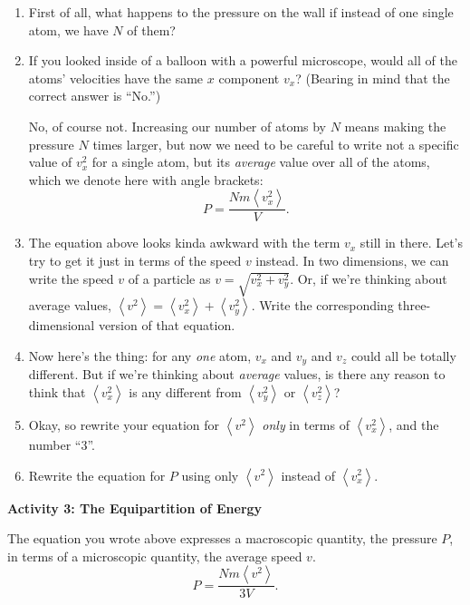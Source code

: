\begin{enumerate}[labparts]

\item First of all, what happens to the pressure on the wall if instead of one single atom, we have $N$ of them?
\answerspace{0.4in}


\item If you looked inside of a balloon with a powerful microscope, would all of the atoms' velocities have the same $x$ component $v_x$?  (Bearing in mind that the correct answer is ``No.'')
\answerspace{0.4in}


No, of course not.  Increasing our number of atoms by $N$ means making the pressure $N$ times larger, but now we need to be careful to write not a specific value of $v_x^2$ for a single atom, but its \textit{average} value over all of the atoms, which we denote here with angle brackets:
$$P=\frac{Nm \left< v_x^2 \right>}{V}.$$

\item The equation above looks kinda awkward with the term $v_x$ still in there.  Let's try to get it just in terms of the speed $v$ instead.  In two dimensions, we can write the speed $v$ of a particle as $v = \sqrt{v_x^2 + v_y^2}$.  Or, if we're thinking about average values, 
$\left< v^2 \right> = \left< v_x^2 \right> + \left< v_y^2 \right> $.
Write the corresponding three-dimensional version of that equation.
\answerspace{0.4in}

\item Now here's the thing: for any \textit{one} atom, $v_x$ and $v_y$ and $v_z$ could all be totally different.  But if we're thinking about \textit{average} values, is there any reason to think that $\left< v_x^2 \right >$ is any different from 
 $\left< v_y^2 \right >$ or $\left< v_z^2 \right >$?
\answerspace{0.4in}

\item Okay, so rewrite your equation for $\left< v^2 \right>$ \textit{only} in terms of $\left< v_x^2 \right>$, and the number ``3''. 
\answerspace{0.4in}

\item Rewrite the equation for $P$ using only $\left< v^2 \right>$ instead of $\left< v_x^2 \right>$.
\answerspace{0.4in}

\end{enumerate}

\pagebreak[3]
\textbf{Activity 3: The Equipartition of Energy}

The equation you wrote above expresses a macroscopic quantity, the pressure $P$, in terms of a microscopic quantity, the average speed $v$.  
$$P=\frac{Nm \left< v^2 \right>}{3V}.$$

